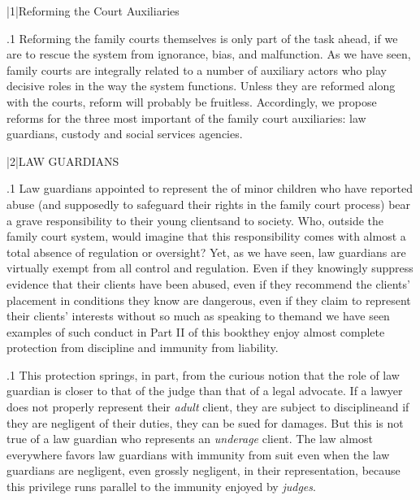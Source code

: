 \documentclass[11pt, twoside]{article}
\begin{document}
\thispagestyle{empty}

{\fontsize{13}{19}\selectfont


\hspace{-5em}\begin{minipage}{1.1\textwidth}
\begin{flushright}
{\fontsize{14}{22}\selectfont
\textbf{%
}
}
\end{flushright}
\end{minipage}


\vspace{6em}





\s|1|{Reforming the Court Auxiliaries}

\p.1{%
\noindent{}Reforming the family courts themselves is only part of the task ahead, if
we are to rescue the system from ignorance, bias, and malfunction. As
we have seen, family courts are integrally related to a number of auxiliary actors who play decisive roles in the way the system functions.
Unless they are reformed along with the courts, reform will probably be
fruitless.
Accordingly, we propose reforms for the three most important of the
family court auxiliaries: law guardians, custody  and social
services agencies.
}%


\s|2|{LAW GUARDIANS}

\p.1{%
\noindent{}Law guardians appointed to represent the  of minor children who have reported abuse (and supposedly to safeguard their rights
in the family court process) bear a grave responsibility to their young
clients\mdash{}and to society. Who, outside the family court system, would
imagine that this responsibility comes with almost a total absence of
regulation or oversight? Yet, as we have seen, law guardians are virtually
exempt from all control and regulation. Even if they knowingly suppress
evidence that their clients have been abused, even if they recommend
the clients’ placement in conditions they know are dangerous, even if
they claim to represent their clients’ interests without so much as speaking to them\mdash{}and we have seen examples of such conduct in Part II of
this book\mdash{}they enjoy almost complete protection from discipline and
immunity from liability.
}%

\p.1{%
This protection springs, in part, from the curious notion that the role
of law guardian is closer to that of the judge than that of a legal advocate.
If a lawyer does not properly represent their \textit{adult} client, they are subject to
discipline\mdash{}and if they are negligent of their duties, they can be sued for damages. But this is not true of a law guardian who represents an \textit{underage}
client. The law almost everywhere favors law guardians with immunity
from suit even when the law guardians are negligent, even grossly negligent, in their representation, because this privilege runs parallel to the
immunity enjoyed by \textit{judges}.
}%

}
\end{document}
